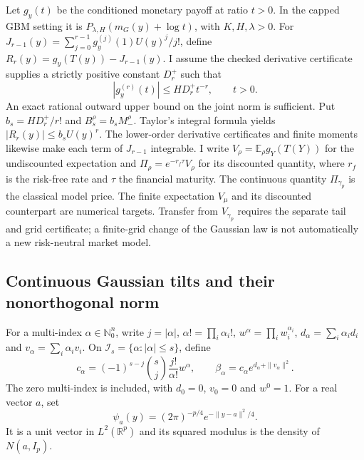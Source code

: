 Let $g_y(t)$ be the conditioned monetary payoff at ratio $t>0$.
In the capped GBM setting it is
$P_{\lambda,H}(m_G(y)+\log t)$, with $K,H,\lambda>0$.
For $J_{r-1}(y)=\sum_{j=0}^{r-1}g_y^{(j)}(1)U(y)^j/j!$,
define $R_r(y)=g_y(T(y))-J_{r-1}(y)$. I assume the checked derivative
certificate supplies a strictly positive constant $D_r^+$ such that
\[
 |g_y^{(r)}(t)|\leq H D_r^+t^{-r},\qquad t>0.
\]
An exact rational outward upper bound on the joint norm is sufficient.
Put $b_s=H D_r^+/r!$ and $B_s^\rho=b_sM_-^\rho$.
Taylor's integral formula yields $|R_r(y)|\leq b_sU(y)^r$.
The lower-order derivative certificates and finite moments likewise
make each term of $J_{r-1}$ integrable.
I write $V_\rho=\mathbb E_\rho g_Y(T(Y))$ for the undiscounted
expectation and $\Pi_\rho=e^{-r_f\tau}V_\rho$ for its discounted quantity,
where $r_f$ is the risk-free rate and $\tau$ the financial maturity.
The continuous quantity $\Pi_{\gamma_p}$ is the classical model price.
The finite expectation $V_\mu$ and its discounted counterpart are
numerical targets. Transfer from $V_{\gamma_p}$ requires the separate
tail and grid certificate; a finite-grid change of the Gaussian law is
not automatically a new risk-neutral market model.

\subsection{Continuous Gaussian tilts and their nonorthogonal norm}

For a multi-index $\alpha\in\mathbb N_0^n$, write
$j=|\alpha|$, $\alpha!=\prod_i\alpha_i!$, $w^\alpha=\prod_iw_i^{\alpha_i}$,
$d_\alpha=\sum_i\alpha_i d_i$ and
$v_\alpha=\sum_i\alpha_i v_i$. On
$\mathcal I_s=\{\alpha:|\alpha|\leq s\}$, define
\[
 c_\alpha=(-1)^{s-j}\binom sj\frac{j!}{\alpha!}w^\alpha,
 \qquad
 \beta_\alpha=c_\alpha e^{d_\alpha+\|v_\alpha\|^2}.
\]
The zero multi-index is included, with $d_0=0$, $v_0=0$ and
$w^0=1$. For a real vector $a$, set
\[
 \psi_a(y)=(2\pi)^{-p/4}e^{-\|y-a\|^2/4}.
\]
It is a unit vector in $L^2(\mathbb R^p)$ and its squared modulus is
the density of $N(a,I_p)$.

